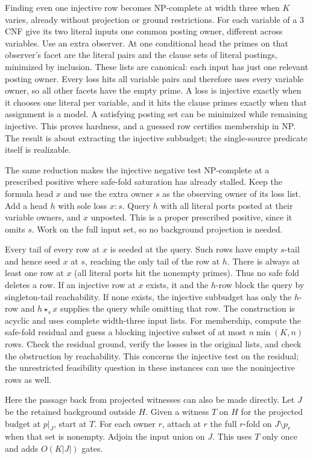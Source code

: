 Finding even one injective row becomes NP-complete
at width three when $K$ varies, already without
projection or ground restrictions. For each variable
of a $3$CNF give its two literal inputs one common
posting owner, different across variables. Use an
extra observer. At one conditional head the primes
on that observer's facet are the literal pairs and
the clause sets of literal postings, minimized by
inclusion. These lists are canonical: each input
has just one relevant posting owner. Every loss
hits all variable pairs and therefore uses every
variable owner, so all other facets have the empty
prime. A loss is injective exactly when it chooses
one literal per variable, and it hits the clause
primes exactly when that assignment is a model.
A satisfying posting set can be minimized while
remaining injective. This proves hardness, and a
guessed row certifies membership in NP. The result
is about extracting the injective subbudget; the
single-source predicate itself is realizable.

The same reduction makes the injective negative
test NP-complete at a prescribed positive where
safe-fold saturation has already stalled. Keep the
formula head $x$ and use the extra owner $s$ as
the observing owner of its loss list. Add a head
$h$ with sole loss $x{:}s$. Query $h$ with all
literal ports posted at their variable owners,
and $x$ unposted. This is a proper prescribed
positive, since it omits $s$. Work on the full
input set, so no background projection is needed.

Every tail of every row at $x$ is seeded at the
query. Such rows have empty $s$-tail and hence
seed $x$ at $s$, reaching the only tail of the
row at $h$. There is always at least one row at
$x$ (all literal ports hit the nonempty primes).
Thus no safe fold deletes a row. If an injective
row at $x$ exists, it and the $h$-row block the
query by singleton-tail reachability. If none
exists, the injective subbudget has only the
$h$-row and $h\star_s x$ supplies the query while
omitting that row. The construction is acyclic
and uses complete width-three input lists.
For membership, compute the safe-fold residual
and guess a blocking injective subset of at most
$n\min(K,n)$ rows. Check the residual ground,
verify the losses in the original lists, and
check the obstruction by reachability.
This concerns the injective test on the residual;
the unrestricted feasibility question in these
instances can use the noninjective rows as well.

Here the passage back from projected witnesses can
also be made directly. Let $J$ be the retained
background outside $H$. Given a witness $T$ on $H$
for the projected budget at $p|_J$, start at $T$.
For each owner $r$, attach at $r$ the full $r$-fold
on $J\setminus p_r$ when that set is nonempty.
Adjoin the input union on $J$. This uses $T$ only
once and adds $O(K|J|)$ gates.

